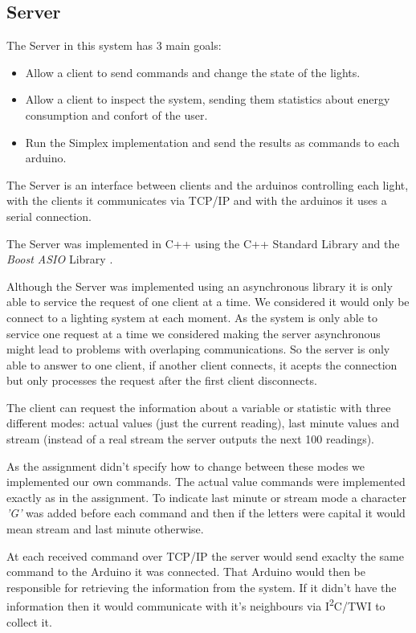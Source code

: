 \subsection{Server}
\label{sec:Server}

The Server in this system has 3 main goals:
\begin{itemize}
    \item Allow a client to send commands and change the state of the lights.
    \item Allow a client to inspect the system, sending them statistics about energy consumption and confort of the user.
    \item Run the Simplex implementation and send the results as commands to each arduino.
\end{itemize}

The Server is an interface between clients and the arduinos controlling each light, with the clients it communicates via TCP/IP and with the arduinos it uses a serial connection.

The Server was implemented in C++ using the C++ Standard Library and the \emph{Boost ASIO} Library \cite{BoostSite}.

Although the Server was implemented using an asynchronous library it is only able to service the request of one client at a time.
We considered it would only be connect to a lighting system at each moment.
As the system is only able to service one request at a time we considered making the server asynchronous might lead to problems with overlaping communications.
So the server is only able to answer to one client, if another client connects, it acepts the connection but only processes the request after the first client disconnects.

The client can request the information about a variable or statistic with three different modes: actual values (just the current reading), last minute values and stream (instead of a real stream the server outputs the next 100 readings).

As the assignment didn't specify how to change between these modes we implemented our own commands. The actual value commands were implemented exactly as in the assignment.
To indicate last minute or stream mode a character \emph{'G'} was added before each command and then if the letters were capital it would mean stream and last minute otherwise.

At each received command over TCP/IP the server would send exaclty the same command to the Arduino it was connected. That Arduino would then be responsible for retrieving the information from the system. If it didn't have the information then it would communicate with it's neighbours via  I\textsuperscript{2}C/TWI to collect it.
